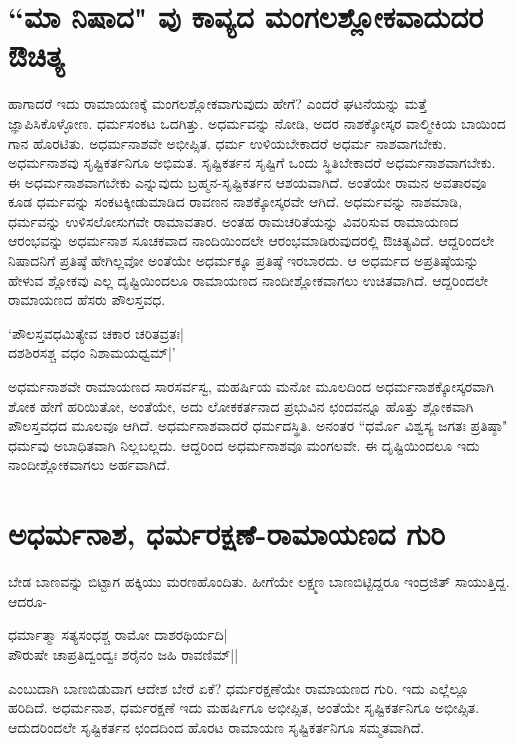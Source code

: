 \section*{``ಮಾ ನಿಷಾದ" ವು ಕಾವ್ಯದ ಮಂಗಲಶ್ಲೋಕವಾದುದರ ಔಚಿತ್ಯ} 

ಹಾಗಾದರೆ ಇದು ರಾಮಾಯಣಕ್ಕೆ ಮಂಗಲಶ್ಲೋಕವಾಗುವುದು ಹೇಗೆ? ಎಂದರೆ ಘಟನೆಯನ್ನು ಮತ್ತೆ ಜ್ಞಾಪಿಸಿಕೊಳ್ಳೋಣ. ಧರ್ಮಸಂಕಟ ಒದಗಿತ್ತು. ಅಧರ್ಮವನ್ನು ನೋಡಿ, ಅದರ ನಾಶಕ್ಕೋಸ್ಕರ ವಾಲ್ಮೀಕಿಯ ಬಾಯಿಂದ ಗಾನ ಹೊರಟಿತು. ಅಧರ್ಮನಾಶವೇ ಅಭೀಪ್ಸಿತ. ಧರ್ಮ ಉಳಿಯಬೇಕಾದರೆ ಅಧರ್ಮ ನಾಶವಾಗಬೇಕು. ಅಧರ್ಮನಾಶವು ಸೃಷ್ಟಿಕರ್ತನಿಗೂ ಅಭಿಮತ. ಸೃಷ್ಟಿಕರ್ತನ ಸೃಷ್ಟಿಗೆ ಒಂದು ಸ್ಥಿತಿಬೇಕಾದರೆ ಅಧರ್ಮನಾಶವಾಗಬೇಕು. ಈ ಅಧರ್ಮನಾಶವಾಗಬೇಕು ಎನ್ನುವುದು ಬ್ರಹ್ಮನ-ಸೃಷ್ಟಿಕರ್ತನ ಆಶಯವಾಗಿದೆ. ಅಂತೆಯೇ ರಾಮನ ಅವತಾರವೂ ಕೂಡ ಧರ್ಮವನ್ನು ಸಂಕಟಕ್ಕೀಡುಮಾಡಿದ ರಾವಣನ ನಾಶಕ್ಕೋಸ್ಕರವೇ ಆಗಿದೆ. ಅಧರ್ಮವನ್ನು ನಾಶಮಾಡಿ, ಧರ್ಮವನ್ನು ಉಳಿಸಲೋಸುಗವೇ ರಾಮಾವತಾರ. ಅಂತಹ ರಾಮಚರಿತೆಯನ್ನು ವಿವರಿಸುವ ರಾಮಾಯಣದ ಆರಂಭವನ್ನು ಅಧರ್ಮನಾಶ ಸೂಚಕವಾದ ನಾಂದಿಯಿಂದಲೇ ಆರಂಭಮಾಡಿರುವುದರಲ್ಲಿ ಔಚಿತ್ಯವಿದೆ. ಆದ್ದರಿಂದಲೇ ನಿಷಾದನಿಗೆ ಪ್ರತಿಷ್ಠೆ ಹೇಗಿಲ್ಲವೋ ಅಂತೆಯೇ ಅಧರ್ಮಕ್ಕೂ ಪ್ರತಿಷ್ಠೆ ಇರಬಾರದು. ಆ ಅಧರ್ಮದ ಅಪ್ರತಿಷ್ಠೆಯನ್ನು ಹೇಳುವ ಶ್ಲೋಕವು ಎಲ್ಲ ದೃಷ್ಟಿಯಿಂದಲೂ ರಾಮಾಯಣದ ನಾಂದೀಶ್ಲೋಕವಾಗಲು ಉಚಿತವಾಗಿದೆ. ಆದ್ದರಿಂದಲೇ ರಾಮಾಯಣದ ಹೆಸರು ಪೌಲಸ್ತವಧ. 

\begin{shloka} 
`ಪೌಲಸ್ತವಧಮಿತ್ಯೇವ ಚಕಾರ ಚರಿತವ್ರತಃ|\label{207c}\\ 
ದಶಶಿರಸಶ್ಚ ವಧಂ ನಿಶಾಮಯಧ್ವಮ್‍|'\label{207}
\end{shloka}

ಅಧರ್ಮನಾಶವೇ ರಾಮಾಯಣದ ಸಾರಸರ್ವಸ್ವ, ಮಹರ್ಷಿಯ ಮನೋ ಮೂಲದಿಂದ ಅಧರ್ಮನಾಶಕ್ಕೋಸ್ಕರವಾಗಿ ಶೋಕ ಹೇಗೆ ಹರಿಯಿತೋ, ಅಂತೆಯೇ, ಅದು ಲೋಕಕರ್ತನಾದ ಪ್ರಭುವಿನ ಛಂದವನ್ನೂ ಹೊತ್ತು ಶ್ಲೋಕವಾಗಿ ಪೌಲಸ್ತವಧದ ಮೂಲವೂ ಆಗಿದೆ. ಅಧರ್ಮನಾಶವಾದರೆ ಧರ್ಮದಸ್ಥಿತಿ. ಅನಂತರ ``ಧರ್ಮೊ ವಿಶ್ವಸ್ಯ ಜಗತಃ ಪ್ರತಿಷ್ಠಾ"\label{207b} ಧರ್ಮವು ಅಬಾಧಿತವಾಗಿ ನಿಲ್ಲಬಲ್ಲದು. ಆದ್ದರಿಂದ ಅಧರ್ಮನಾಶವೂ ಮಂಗಲವೇ. ಈ ದೃಷ್ಟಿಯಿಂದಲೂ ಇದು ನಾಂದೀಶ್ಲೋಕವಾಗಲು ಅರ್ಹವಾಗಿದೆ. 

\section*{ಅಧರ್ಮನಾಶ, ಧರ್ಮರಕ್ಷಣೆ-ರಾಮಾಯಣದ ಗುರಿ} 

ಬೇಡ ಬಾಣವನ್ನು ಬಿಟ್ಟಾಗ ಹಕ್ಕಿಯು ಮರಣಹೊಂದಿತು. ಹೀಗೆಯೇ ಲಕ್ಷ್ಮಣ ಬಾಣಬಿಟ್ಟಿದ್ದರೂ ಇಂದ್ರಜಿತ್‍ ಸಾಯುತ್ತಿದ್ದ. ಆದರೂ- 


\begin{shloka}
ಧರ್ಮಾತ್ಮಾ ಸತ್ಯಸಂಧಶ್ಚ ರಾಮೋ ದಾಶರಥಿರ್ಯದಿ|\label{207a}\\ 
ಪೌರುಷೇ ಚಾಪ್ರತಿದ್ವಂದ್ವಃ ಶರೈನಂ ಜ{ಹಿ} ರಾವಣಿಮ್‍||
\end{shloka}

ಎಂಬುದಾಗಿ ಬಾಣಬಿಡುವಾಗ ಆದೇಶ ಬೇರೆ ಏಕೆ? ಧರ್ಮರಕ್ಷಣೆಯೇ ರಾಮಾಯಣದ ಗುರಿ. ಇದು ಎಲ್ಲೆಲ್ಲೂ ಹರಿದಿದೆ. ಅಧರ್ಮನಾಶ, ಧರ್ಮರಕ್ಷಣೆ ಇದು ಮಹರ್ಷಿಗೂ ಅಭೀಪ್ಸಿತ, ಅಂತೆಯೇ ಸೃಷ್ಟಿಕರ್ತನಿಗೂ ಅಭೀಪ್ಸಿತ. ಆದುದರಿಂದಲೇ ಸೃಷ್ಟಿಕರ್ತನ ಛಂದದಿಂದ ಹೊರಟ ರಾಮಾಯಣ ಸೃಷ್ಟಿಕರ್ತನಿಗೂ ಸಮ್ಮತವಾಗಿದೆ. 

